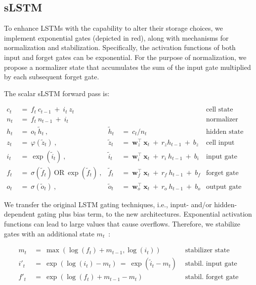\subsection{sLSTM}
\label{sec:sLSTM}

To enhance LSTMs with the capability to alter their storage choices, we implement exponential gates (depicted in red), along with mechanisms for normalization and stabilization. Specifically, the activation functions of both input and forget gates can be exponential. For the purpose of normalization, we propose a normalizer state that accumulates the sum of the input gate multiplied by each subsequent forget gate.

The scalar sLSTM forward pass is:

\begin{align}
\label{eq:slstmforward}
c_t \ &= \  f_t \ c_{t-1} \ + \ i_t \ z_t & & 
 &\text{cell state} \\
n_t \ &= \  f_t \ n_{t-1} \ + \ i_t  & & 
 &\text{normalizer state} \\
h_t \ &= \ o_t \ \tilde{h}_t \ ,
  &\tilde{h}_t \ &= \ c_t / n_t
&\text{hidden state} \\
z_t \ &= \ \varphi \left( \tilde{z}_t \right) \ , 
  &\tilde{z}_t \ &=  \ \mathbf{w}^\top_{z} \ \mathbf{x}_t \ + \
  r_{z}  h_{t-1} \ + \  b_{z}
  &\text{cell input} \\
i_t \ &= \ \!\exp \left( \tilde{i}_t  \right) \ , 
  &\tilde{i}_t \ &= \ \mathbf{w}^\top_{i} \ \mathbf{x}_t \ + \
  r_{i}  \ h_{t-1} \ + \  b_{i}
  &\text{input gate} \\
f_t \ &= \ \sigma \left(  \tilde{f}_t \right) \ \text{OR} \
\!\exp \left(  \tilde{f}_t \right) \ ,
  &\tilde{f}_t \ &= \ \mathbf{w}^\top_{f} \ \mathbf{x}_t  \ + \
  r_{f}  \ h_{t-1} \ + \  b_{f}
  &\text{forget gate} \\
o_t \ &= \ \sigma \left( \tilde{o}_t \right) \ , 
  &\tilde{o}_t  \ &= \ \mathbf{w}^\top_{o} \ \mathbf{x}_t \ + \
  r_{o}  \ h_{t-1} \ + \  b_{o}
  &\text{output gate} 
\end{align}

We transfer the original LSTM gating techniques, i.e., input- and/or hidden-dependent gating plus bias term, to the new architectures. Exponential activation functions can lead to large values that cause overflows. Therefore, we stabilize gates with an additional state \mbox{$m_t$~\citep{Milakov:18arxiv}}:

\begin{align}
\label{eq:slstmstabil}
m_t \ &= \ \max \left( \log ( f_t ) + m_{t-1} , \log ( i_t ) \right) &\text{stabilizer state} \\
i'_t \ &= \ \!\exp \left( \log \left ( i_t \right) - m_t \right) \ = \ \!\exp \left( \tilde{i}_t - m_t \right) \ \, 
  &\text{stabil. input gate} \\
f'_t \ &= \ \!\exp \left( \log \left( f_t \right) + m_{t-1} - m_t \right) \ \, 
  &\text{stabil. forget gate}
\end{align}

